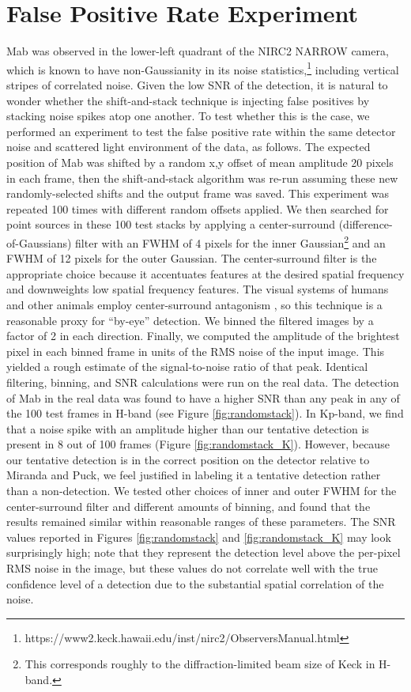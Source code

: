 \documentclass[preprint]{aastex631}
\begin{document}
\section{False Positive Rate Experiment}
\label{s:falsepositives}

Mab was observed in the lower-left quadrant of the NIRC2 NARROW camera, which is known to have non-Gaussianity in its noise statistics,\footnote{https://www2.keck.hawaii.edu/inst/nirc2/ObserversManual.html} including vertical stripes of correlated noise. Given the low SNR of the detection, it is natural to wonder whether the shift-and-stack technique is injecting false positives by stacking noise spikes atop one another. To test whether this is the case, we performed an experiment to test the false positive rate within the same detector noise and scattered light environment of the data, as follows. The expected position of Mab was shifted by a random x,y offset of mean amplitude 20 pixels in each frame, then the shift-and-stack algorithm was re-run assuming these new randomly-selected shifts and the output frame was saved. This experiment was repeated 100 times with different random offsets applied. We then searched for point sources in these 100 test stacks by applying a center-surround (difference-of-Gaussians) filter with an FWHM of 4 pixels for the inner Gaussian\footnote{This corresponds roughly to the diffraction-limited beam size of Keck in H-band.} and an FWHM of 12 pixels for the outer Gaussian. The center-surround filter is the appropriate choice because it accentuates features at the desired spatial frequency and downweights low spatial frequency features. The visual systems of humans and other animals employ center-surround antagonism \citep{graham06}, so this technique is a reasonable proxy for ``by-eye'' detection. We binned the filtered images by a factor of 2 in each direction. Finally, we computed the amplitude of the brightest pixel in each binned frame in units of the RMS noise of the input image. This yielded a rough estimate of the signal-to-noise ratio of that peak. Identical filtering, binning, and SNR calculations were run on the real data. The detection of Mab in the real data was found to have a higher SNR than any peak in any of the 100 test frames in H-band (see Figure \ref{fig:randomstack}). In Kp-band, we find that a noise spike with an amplitude higher than our tentative detection is present in 8 out of 100 frames (Figure \ref{fig:randomstack_K}). However, because our tentative detection is in the correct position on the detector relative to Miranda and Puck, we feel justified in labeling it a tentative detection rather than a non-detection. We tested other choices of inner and outer FWHM for the center-surround filter and different amounts of binning, and found that the results remained similar within reasonable ranges of these parameters. The SNR values reported in Figures \ref{fig:randomstack} and \ref{fig:randomstack_K} may look surprisingly high; note that they represent the detection level above the per-pixel RMS noise in the image, but these values do not correlate well with the true confidence level of a detection due to the substantial spatial correlation of the noise.
\end{document}
